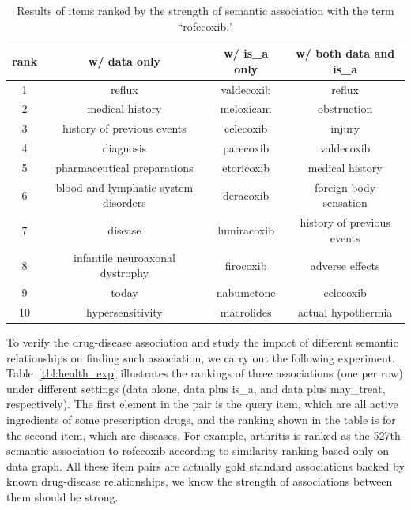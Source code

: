 \begin{table}[htbp]\scriptsize
\begin{center}
\begin{tabular}{ c | c | c | c  }
\hline
rank    &   w/ data only	&	w/ is\_a only		& w/ both data and is\_a \\
\hline
1	&		reflux	&	valdecoxib	&		reflux	\\
2	&		medical history	&	meloxicam	&		obstruction	\\
3	&		history of previous events	&	celecoxib	&		injury	\\
4	&		diagnosis	&	parecoxib	&		valdecoxib	\\
5	&		pharmaceutical preparations	&	etoricoxib	&		medical history	\\
6	&		blood and lymphatic system disorders	&	deracoxib	&		foreign body sensation	\\
7	&		disease	&	lumiracoxib	&		history of previous events	\\
8	&		infantile neuroaxonal dystrophy	&	firocoxib	&		adverse effects	\\
9	&		today	&	nabumetone	&		celecoxib	\\
10	&		hypersensitivity	&	macrolides	&		actual hypothermia	\\
\hline
\end{tabular}
\end{center}
\caption[Top results on the electronic health dataset]{\label{tbl:health_comp}Results of items ranked by the strength of semantic association with the term ``rofecoxib."}
\end{table}

To verify the drug-disease association and study the impact of different semantic relationships on finding such association, we carry out the following experiment. Table~\ref{tbl:health_exp} illustrates the rankings of three associations (one per row) under different settings (data alone, data plus is\_a, and data plus may\_treat, respectively). The first element in the pair is the query item, which are all active ingredients of some prescription drugs, and the ranking shown in the table is for the second item, which are diseases. For example, arthritis is ranked as the 527th semantic association to rofecoxib according to similarity ranking based only on data graph. All these item pairs are actually gold standard associations backed by known drug-disease relationships, we know the strength of associations between them should be strong.

